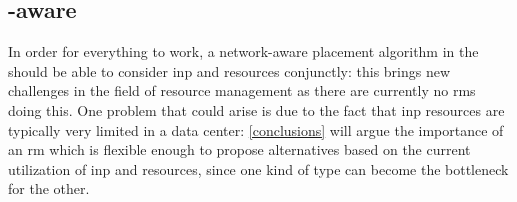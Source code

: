 \subsection{\texorpdfstring{}{INP}-aware \texorpdfstring{}{Resource Managers}} \label{inp_aware_rms}
In order for everything to work, a network-aware placement algorithm in the  should be able to consider \gls{inp} and  resources conjunctly: this brings new challenges in the field of resource management as there are currently no \glspl{rm} doing this.
One problem that could arise is due to the fact that \gls{inp} resources are typically very limited in a data center: \autoref{conclusions} will argue the importance of an \gls{rm} which is flexible enough to propose alternatives based on the current utilization of \gls{inp} and  resources, since one kind of  type can become the bottleneck for the other.